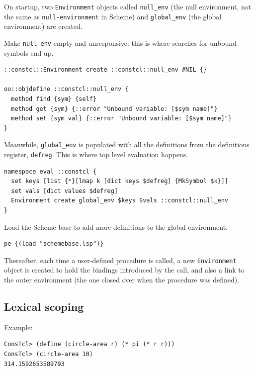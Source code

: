\documentclass[twoside,9pt]{report}
\begin{document}
On startup, two \texttt{Environment} objects called \texttt{null\_env} (the null environment, not the same as \texttt{null-environment} in Scheme) and \texttt{global\_env} (the global environment) are created.


Make \texttt{null\_env} empty and unresponsive: this is where searches for unbound symbols end up.

\noindent\makebox[\linewidth]{\rule{\linewidth}{0.4pt}}
\begin{lstlisting}
::constcl::Environment create ::constcl::null_env #NIL {}
 
oo::objdefine ::constcl::null_env {
  method find {sym} {self}
  method get {sym} {::error "Unbound variable: [$sym name]"}
  method set {sym val} {::error "Unbound variable: [$sym name]"}
}
\end{lstlisting}
\noindent\makebox[\linewidth]{\rule{\linewidth}{0.4pt}}

Meanwhile, \texttt{global\_env} is populated with all the definitions from the definitions register, \texttt{defreg}. This is where top level evaluation happens.

\noindent\makebox[\linewidth]{\rule{\linewidth}{0.4pt}}
\begin{lstlisting}
namespace eval ::constcl {
  set keys [list {*}[lmap k [dict keys $defreg] {MkSymbol $k}]]
  set vals [dict values $defreg]
  Environment create global_env $keys $vals ::constcl::null_env
}
\end{lstlisting}
\noindent\makebox[\linewidth]{\rule{\linewidth}{0.4pt}}

Load the Scheme base to add more definitions to the global environment.

\noindent\makebox[\linewidth]{\rule{\linewidth}{0.4pt}}
\begin{lstlisting}
pe {(load "schemebase.lsp")}
\end{lstlisting}
\noindent\makebox[\linewidth]{\rule{\linewidth}{0.4pt}}

Thereafter, each time a user-defined procedure is called, a new \texttt{Environment} object is created to hold the bindings introduced by the call, and also a link to the outer environment (the one closed over when the procedure was defined).

\subsection{Lexical scoping}
\label{lexical-scoping}

Example:

\noindent\makebox[\linewidth]{\rule{\linewidth}{0.4pt}}
\begin{lstlisting}
ConsTcl> (define (circle-area r) (* pi (* r r)))
ConsTcl> (circle-area 10)
314.1592653589793
\end{lstlisting}
\noindent\makebox[\linewidth]{\rule{\linewidth}{0.4pt}}
\end{document}
